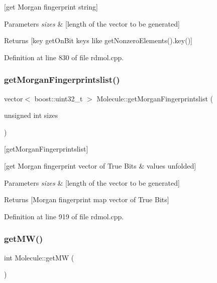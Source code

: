 \mbox{[}get Morgan fingerprint string\mbox{]} 
\begin{DoxyParams}{Parameters}
{\em sizes} & \mbox{[}length of the vector to be generated\mbox{]}\\
\hline
\end{DoxyParams}
\begin{DoxyReturn}{Returns}
\mbox{[}key get\+On\+Bit keys like get\+Nonzero\+Elements().key()\mbox{]} 
\end{DoxyReturn}


Definition at line 830 of file rdmol.\+cpp.

\mbox{\label{class_molecule_aa3eccf55a9d1e512a16d2db64add43d2}} 
\subsubsection{\texorpdfstring{get\+Morgan\+Fingerprintslist()}{getMorganFingerprintslist()}}
{\footnotesize\ttfamily vector$<$ boost\+::uint32\+\_\+t $>$ Molecule\+::get\+Morgan\+Fingerprintslist (\begin{DoxyParamCaption}\item[{unsigned int}]{sizes }\end{DoxyParamCaption})}



\mbox{[}get\+Morgan\+Fingerprintslist\mbox{]} 

\mbox{[}get Morgan fingerprint vector of True Bits \& values unfolded\mbox{]}


\begin{DoxyParams}{Parameters}
{\em sizes} & \mbox{[}length of the vector to be generated\mbox{]} \\
\hline
\end{DoxyParams}
\begin{DoxyReturn}{Returns}
\mbox{[}Morgan fingerprint map vector of True Bits\mbox{]} 
\end{DoxyReturn}


Definition at line 919 of file rdmol.\+cpp.

\mbox{\label{class_molecule_afa532b75ee416a58bf7f628252522e65}} 
\subsubsection{\texorpdfstring{get\+M\+W()}{getMW()}}
{\footnotesize\ttfamily int Molecule\+::get\+MW (\begin{DoxyParamCaption}{ }\end{DoxyParamCaption})}



